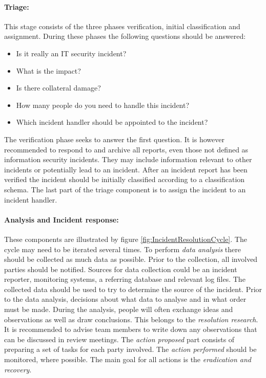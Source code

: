 \paragraph{Triage:} This stage consists of the three phases verification, initial classification and assignment. During these phases the following questions should be answered:

\begin{itemize}\itemsep-0.2cm
\item Is it really an IT security incident?
\item What is the impact?
\item Is there collateral damage?
\item How many people do you need to handle this incident?
\item Which incident handler should be appointed to the incident?
\end{itemize}

The verification phase seeks to answer the first question. It is however recommended to respond to and archive all reports, even those not defined as information security incidents. They may include information relevant to other incidents or potentially lead to an incident. After an incident report has been verified the incident should be initially classified according to a classification schema. The last part of the triage component is to assign the incident to an incident handler.

\paragraph{Analysis and Incident response:} These components are illustrated by figure \ref{fig:IncidentResolutionCycle}. The cycle may need to be iterated several times. To perform \textit{data analysis} there should be collected as much data as possible. Prior to the collection, all involved parties should be notified. Sources for data collection could be an incident reporter, monitoring systems, a referring database and relevant log files. The collected data should be used to try to determine the source of the incident. Prior to the data analysis, decisions about what data to analyse and in what order must be made. During the analysis, people will often exchange ideas and observations as well as draw conclusions. This belongs to the \textit{resolution research}. It is recommended to advise team members to write down any observations that can be discussed in review meetings. The \textit{action proposed} part consists of preparing a set of tasks for each party involved. The \textit{action performed} should be monitored, where possible. The main goal for all actions is the \textit{eradication and recovery}.

